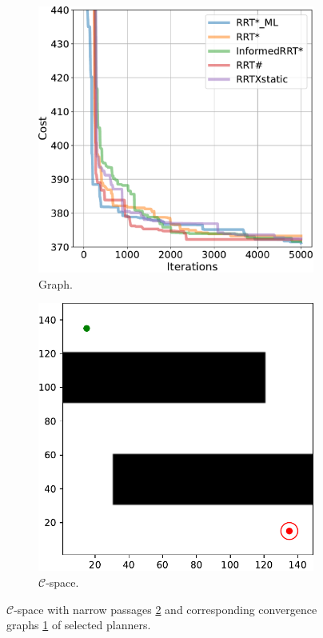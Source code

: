\documentclass{ctuthesis}
\begin{document}
\begin{figure}[!ht]
  \centering 
  \begin{subfigure}[b]{0.48\textwidth}
    \includegraphics[width=\textwidth]{figChap5/graph_E_20pt_ticks.pdf}  
    \caption{Graph.}
    \label{fig:maze_E_graphs}
  \end{subfigure}
  \begin{subfigure}[b]{0.49\textwidth}
      \includegraphics[width=\textwidth]{figChap5/Maze_E_ticks.pdf}
      \caption{$\mathcal{C}$-space.}
      \label{fig:maze_E_Cspace} 
  \end{subfigure}   
  \caption{$\mathcal{C}$-space with narrow passages \ref{fig:maze_E_Cspace} and 
  corresponding convergence graphs \ref{fig:maze_E_graphs} of selected planners.}
  \label{fig:maze_E}
\end{figure}
\end{document}
